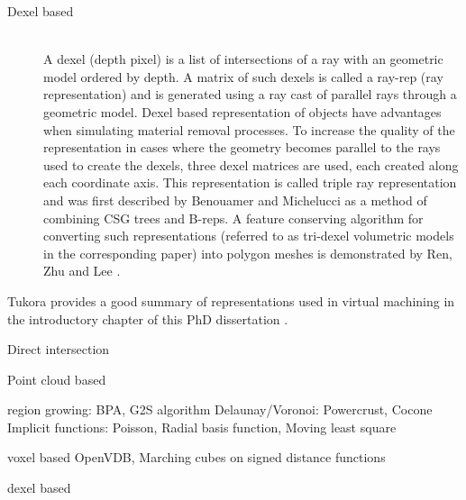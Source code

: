 \begin{description}
	
	\item[Dexel based] \hfill \\
	A dexel (depth pixel) is a list of intersections of a ray with an geometric model ordered by depth. A matrix of such dexels is called a ray-rep (ray representation) and is generated using a ray cast of parallel rays through a geometric model. Dexel based representation of objects have advantages when simulating material removal processes. To increase the quality of the representation in cases where the geometry becomes parallel to the rays used to create the dexels, three dexel matrices are used, each created along each coordinate axis. This representation is called triple ray representation and was first described by Benouamer and Michelucci \cite{tridexel_intersection} as a method of combining CSG trees and B-reps. A feature conserving algorithm for converting such representations (referred to as tri-dexel volumetric models in the corresponding paper) into polygon meshes is demonstrated by Ren, Zhu and Lee \cite{tridexel_reconstruction}.
	
\end{description}



Tukora provides a good summary of representations used in virtual machining in the introductory chapter of this PhD dissertation \cite{virtual_machining_review}.

Direct intersection

Point cloud based

region growing: BPA, G2S algorithm
Delaunay/Voronoi: Powercrust, Cocone
Implicit functions: Poisson, Radial basis function, Moving least square

voxel based
OpenVDB, Marching cubes on signed distance functions

dexel based
